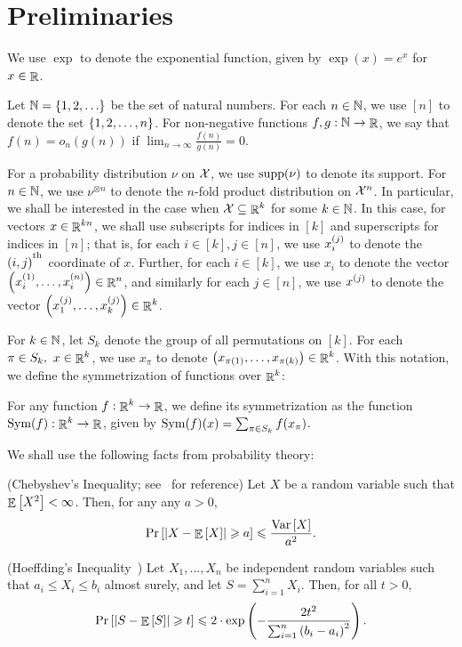 \section{Preliminaries}\label{sec:prelims}

We use $\exp$ to denote the exponential function, given by $\exp(x) = e^x$ for $x\in \mathop{\mathbb{R}}$.

Let $\N = \set{1,2,\dots}$ be the set of natural numbers. For each $n\in \mathbb{N}$, we use $[n]$ to denote the set $\left\{ 1,2,\dots,n \right\}$.
For non-negative functions $f,g:\mathbb{N}\to \mathop{\mathbb{R}}$, we say that $f(n) = o_n(g(n))$ if $\lim_{n\to \infty} \frac{f(n)}{g(n)}=0$.

For a probability distribution $\nu$ on $\mathcal X$, we use $\textnormal{supp}(\nu)$ to denote its support.
For $n\in \mathbb{N}$, we use $\nu^{\otimes n}$ to denote the $n$-fold product distribution on $\mathcal X^n$.
In particular, we shall be interested in the case when $\mathcal X \subseteq  \mathop{\mathbb{R}}^k$ for some $k\in \mathbb{N}$.
In this case, for vectors $x \in \mathop{\mathbb{R}}^{kn}$, we shall use subscripts for indices in $[k]$ and superscripts for indices in $[n]$; that is, for each $i\in [k], j\in [n]$, we use $x_i^{\left( j \right)}$ to denote the $(i,j)^\textsuperscript{th}$ coordinate of $x$.
Further, for each $i\in [k]$, we use $x_i$ to denote the vector $\left( x_i^{\left( 1 \right)},\dots,x_i^{\left( n \right)} \right)\in \mathop{\mathbb{R}}^n$, and similarly for each $j\in [n]$, we use $x^{\left( j \right)}$ to denote the vector $\left( x_1^{\left( j \right)},\dots,x_k^{\left( j \right)} \right)\in \mathop{\mathbb{R}}^k$.

For $k\in \mathbb{N}$, let $S_k$ denote the group of all permutations on $[k]$.
	For each $\pi\in S_k,\ x\in \mathop{\mathbb{R}}^k$, we use $x_\pi$ to denote $\left( x_{\pi(1)},\dots,x_{\pi(k)} \right) \in \mathop{\mathbb{R}}^k$.
With this notation, we define the symmetrization of functions over $\mathop{\mathbb{R}}^k$:
\begin{definition}\label{defn:sym_op}
	For any function $f:\mathop{\mathbb{R}}^k\to \mathop{\mathbb{R}}$, we define its symmetrization as the function $\textnormal{Sym}(f):\mathop{\mathbb{R}}^k\to \mathop{\mathbb{R}}$, given by $\textnormal{Sym}(f)(x) = \sum_{\pi\in S_k}f(x_\pi)$.
\end{definition}

We shall use the following facts from probability theory:

\begin{fact}\label{fact:chebyshev}(Chebyshev's Inequality; see~\cite{Dur19} for reference)
	Let $X$ be a random variable such that $\mathop{\mathbb{E}}\left[ X^2 \right]<\infty$.
	Then, for any any $a>0$,
	\[\Pr\left[ \left|X-\mathop{\mathbb{E}}\left[ X \right]\right| \geqslant a \right] \leqslant \frac{\textnormal{Var}\left[ X \right]}{a^2}.\]
\end{fact}

\begin{fact}\label{fact:hoeffding}(Hoeffding's Inequality~\cite{Hoe63})
	Let $X_1,\dots, X_n$ be independent random variables such that $a_i\leq X_i \leq b_i$ almost surely, and let $S = \sum_{i=1}^n X_i$.
	Then, for all $t>0$,
	\[\Pr\left[ \left|S - \mathop{\mathbb{E}}\left[ S \right]\right| \geqslant  t \right] \leqslant 2\cdot \exp\left( -\frac{2t^2}{\sum_{i=1}^n \left( b_i-a_i \right)^2} \right). \]
\end{fact}


